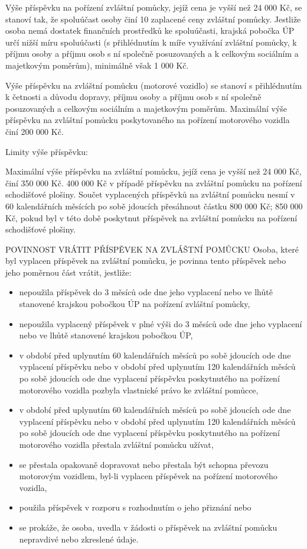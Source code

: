 \documentclass[thesis=M,czech]{FITthesis}[2012/06/26]
\begin{document}
Výše příspěvku na pořízení zvláštní pomůcky, jejíž cena je vyšší než 24 000
Kč, se stanoví tak, že spoluúčast osoby činí 10 %
zaplacené ceny zvláštní pomůcky. Jestliže osoba nemá dostatek finančních
prostředků ke spoluúčasti, krajská pobočka ÚP určí nižší míru spoluúčasti (s
přihlédnutím k míře využívání zvláštní pomůcky, k příjmu osoby a příjmu osob
s ní společně posuzovaných a k  celkovým sociálním a majetkovým poměrům),
minimálně však 1 000 Kč.

Výše příspěvku na zvláštní pomůcku (motorové vozidlo) se stanoví s
přihlédnutím k četnosti a důvodu dopravy, příjmu osoby a příjmu osob s ní
společně posuzovaných a celkovým sociálním a majetkovým poměrům. Maximální
výše příspěvku na zvláštní pomůcku poskytovaného na pořízení motorového
vozidla činí 200 000 Kč.

Limity výše příspěvku:

    Maximální výše příspěvku na zvláštní pomůcku, jejíž cena je vyšší
než 24 000 Kč, činí 350 000 Kč. 400 000 Kč v případě příspěvku na zvláštní
pomůcku na pořízení schodišťové plošiny.
    Součet vyplacených příspěvků na zvláštní pomůcku nesmí v 60
kalendářních měsících po sobě jdoucích přesáhnout částku 800 000 Kč; 850 000
Kč, pokud byl v této době poskytnut příspěvek na zvláštní pomůcku na
pořízení schodišťové plošiny.

POVINNOST VRÁTIT PŘÍSPĚVEK NA ZVLÁŠTNÍ POMŮCKU
Osoba, které byl vyplacen příspěvek na zvláštní pomůcku, je povinna tento
příspěvek nebo jeho poměrnou část vrátit, jestliže:
\begin{itemize}
    \item nepoužila příspěvek do 3 měsíců ode dne jeho vyplacení nebo ve
lhůtě stanovené krajskou pobočkou ÚP na pořízení zvláštní pomůcky,
    \item nepoužila vyplacený příspěvek v plné výši do 3 měsíců ode dne
jeho vyplacení nebo ve lhůtě stanovené krajskou pobočkou ÚP,
    \item v období před uplynutím 60 kalendářních měsíců po sobě jdoucích
ode dne vyplacení příspěvku nebo v období před uplynutím 120 kalendářních
měsíců po sobě jdoucích ode dne vyplacení     příspěvku poskytnutého na
pořízení motorového vozidla pozbyla vlastnické právo ke zvláštní pomůcce,
    \item v období před uplynutím 60 kalendářních měsíců po sobě jdoucích
ode dne vyplacení příspěvku nebo v období před uplynutím 120 kalendářních
měsíců po sobě jdoucích ode dne vyplacení     příspěvku poskytnutého na
pořízení motorového vozidla přestala zvláštní pomůcku užívat,
    \item se přestala opakovaně dopravovat nebo přestala být schopna
převozu motorovým vozidlem, byl-li vyplacen příspěvek na pořízení motorového
vozidla,
    \item použila příspěvek v rozporu s rozhodnutím o jeho přiznání nebo
    \item se prokáže, že osoba, uvedla v žádosti o příspěvek na zvláštní
pomůcku nepravdivé nebo zkreslené údaje.
\end{itemize}
\end{document}
